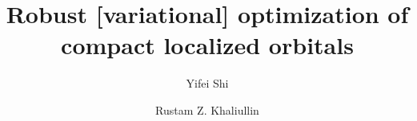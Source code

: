 \documentclass[aps,prl,twocolumn,reprint,amsmath,amssymb]{revtex4-1}
\begin{document}
\newcommand{\Ang}{\ensuremath{\mathring{\text{A}}}}
\newcommand{\ltwid}{\mathrel{\raise.3ex\hbox{$<$\kern-.75em\lower1ex\hbox{$\sim$}}}}
\newcommand{\gtwid}{\mathrel{\raise.3ex\hbox{$>$\kern-.75em\lower1ex\hbox{$\sim$}}}}
\newcommand{\ket}[1]{\ensuremath{\vert #1 \rangle}}
\newcommand{\bra}[1]{\ensuremath{\langle #1 \vert}}
\newcommand{\braket}[2]{\ensuremath{\langle #1 \vert #2 \rangle}} %
\newcommand{\ketbra}[2]{\ensuremath{\vert #1 \rangle \langle #2 \vert}} %
\newcommand{\op}[1]{\ensuremath{\hat{#1}}} %
\newcommand{\sill}{\psi}
\newcommand{\trace}{{\rm Tr}}
\newcommand{\ntilde}{\tilde{n}}
\newcommand{\stilde}{\tilde{s}}
\newcommand{\atilde}{\tilde{\alpha}}
\newcommand{\new}{\color{red}}
\newcommand{\old}{\color{black}}
\newcommand{\bea}{\begin{eqnarray}}
\newcommand{\eea}{\end{eqnarray}}
\newcommand{\br}{\ensuremath{\mathbf{r}}}
\def\nn{\nonumber\\}



\title{Robust [variational] optimization of compact localized orbitals}

\author{Yifei Shi}
\author{Rustam Z. Khaliullin}

\end{document}
